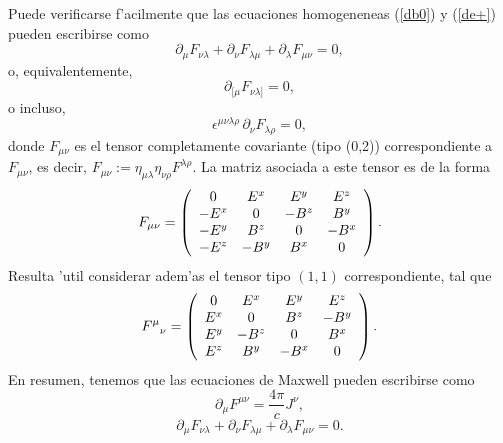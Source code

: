 Puede verificarse f'acilmente que las ecuaciones homogeneneas (\ref{db0}) y (\ref{de+}) pueden escribirse como
\begin{equation}
\partial_\mu F_{\nu\lambda}+\partial_\nu F_{\lambda\mu}+\partial_\lambda
F_{\mu\nu}=0,
\end{equation}
o, equivalentemente,
\begin{equation}
\partial_{[\mu}F_{\nu\lambda]}=0,
\end{equation}
o incluso,
\begin{equation}
\epsilon^{\mu\nu\lambda\rho}\,\partial_{\nu}F_{\lambda\rho}=0,
\end{equation}
donde $F_{\mu\nu}$ es el tensor completamente covariante (tipo (0,2))
correspondiente a $F_{\mu\nu}$, es decir,
$F_{\mu\nu}:=\eta_{\mu\lambda}\eta_{\nu\rho}F^{\lambda\rho}$. La matriz asociada
a este tensor es de la forma
\begin{equation}
F_{\mu\nu}=\left(
\begin{array}
[c]{cccc}%
0 & E^x & E^y & E^z\\
-E^x & 0 & -B^z & B^y\\
-E^y & B^z & 0 & -B^x\\
-E^z & -B^y & B^x & 0
\end{array}
\right). \label{Fdndn}
\end{equation}
Resulta 'util considerar adem'as el tensor tipo $(1,1)$ correspondiente, tal que
\begin{equation}
F^\mu_{\ \ \nu}=\left(
\begin{array}
[c]{cccc}%
0 & E^x & E^y & E^z\\
E^x & 0 & B^z & -B^y\\
E^y & -B^z & 0 & B^x\\
E^z & B^y & -B^x & 0
\end{array}
\right). \label{Fupdn}
\end{equation}
En resumen, tenemos que las ecuaciones de Maxwell pueden escribirse como
\begin{equation}
\boxed{\partial_\mu  F^{\mu \nu} = \frac{4\pi}{c} J^\nu,} \label{emihF}
\end{equation}
\begin{equation}
\boxed{\partial_\mu F_{\nu\lambda}+\partial_\nu F_{\lambda\mu}+\partial_\lambda
F_{\mu\nu}=0.} \label{homcov}
\end{equation}

